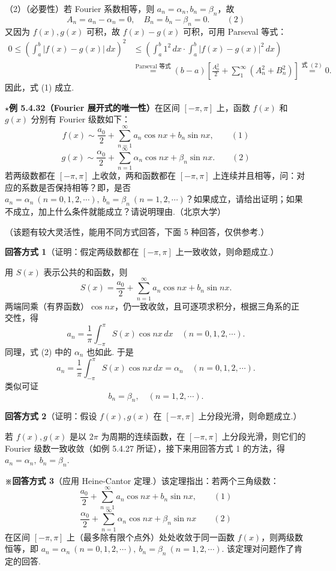 \documentclass[UTF8, 12pt, fontset=fandol, oneside]{ctexart}
\providecommand{\xlongequal}[1]{\stackrel{#1}{=}}
\begin{document}
（2）（必要性）若 Fourier 系数相等，则 $a_n=\alpha_n,b_n=\beta_n$，故
\[
  A_n=a_n-\alpha_n=0,\quad B_n=b_n-\beta_n=0. \qquad(2)
\]
又因为 $f(x),g(x)$ 可积，故 $f(x)-g(x)$ 可积，可用 Parseval 等式：
\[
\begin{aligned}
0\le\left(\int_a^b|f(x)-g(x)|\,dx\right)^2
&\le\left(\int_a^b1^2\,dx\cdot\int_a^b|f(x)-g(x)|^2\,dx\right)\\
&\xlongequal{\text{Parseval 等式}}
(b-a)\left[\frac{A_0^2}{2}+\sum_1^{\infty}(A_n^2+B_n^2)\right]
\xlongequal{\text{式 }(2)}0.
\end{aligned}
\]
因此，式 (1) 成立.

\noindent\(\star\)\textbf{例 5.4.32（Fourier 展开式的唯一性）}\quad 在区间 $[-\pi,\pi]$ 上，函数 $f(x)$ 和
$g(x)$ 分别有 Fourier 级数如下：
\[
  f(x)\sim\frac{a_0}{2}+\sum_{n=1}^{\infty}a_n\cos nx+b_n\sin nx, \qquad(1)
\]
\[
  g(x)\sim\frac{\alpha_0}{2}+\sum_{n=1}^{\infty}\alpha_n\cos nx+\beta_n\sin nx. \qquad(2)
\]
若两级数都在 $[-\pi,\pi]$ 上收敛，两和函数都在 $[-\pi,\pi]$ 上连续并且相等，问：对应的系数是否保持相等？即，是否
$a_n=\alpha_n\ (n=0,1,2,\cdots),\ b_n=\beta_n\ (n=1,2,\cdots)$？如果成立，请给出证明；如果不成立，加上什么条件就能成立？请说明理由.（北京大学）

（该题有较大灵活性，能用不同方式回答，下面 5 种回答，仅供参考.）

\noindent\textbf{回答方式 1}\quad （证明：假定两级数都在 $[-\pi,\pi]$ 上一致收敛，则命题成立.）

用 $S(x)$ 表示公共的和函数，则
\[
  S(x)=\frac{a_0}{2}+\sum_{n=1}^{\infty}a_n\cos nx+b_n\sin nx.
\]
两端同乘（有界函数）$\cos nx$，仍一致收敛，且可逐项求积分，根据三角系的正交性，得
\[
  a_n=\frac1\pi\int_{-\pi}^{\pi}S(x)\cos nx\,dx\quad(n=0,1,2,\cdots).
\]
同理，式 (2) 中的 $\alpha_n$ 也如此. 于是
\[
  a_n=\frac1\pi\int_{-\pi}^{\pi}S(x)\cos nx\,dx=\alpha_n\quad(n=0,1,2,\cdots).
\]
类似可证
\[
  b_n=\beta_n,\quad(n=1,2,\cdots).
\]

\noindent\textbf{回答方式 2}\quad （证明：假设 $f(x),g(x)$ 在 $[-\pi,\pi]$ 上分段光滑，则命题成立.）

若 $f(x),g(x)$ 是以 $2\pi$ 为周期的连续函数，在 $[-\pi,\pi]$ 上分段光滑，则它们的 Fourier 级数一致收敛（如例 5.4.27 所证），接下来用回答方式 1 的方法，得
$a_n=\alpha_n,\ b_n=\beta_n$.

\noindent\textbf{※回答方式 3}\quad （应用 Heine-Cantor 定理.）该定理指出：若两个三角级数：
\[
  \frac{a_0}{2}+\sum_{n=1}^{\infty}a_n\cos nx+b_n\sin nx, \qquad(1)
\]
\[
  \frac{\alpha_0}{2}+\sum_{n=1}^{\infty}\alpha_n\cos nx+\beta_n\sin nx \qquad(2)
\]
在区间 $[-\pi,\pi]$ 上（最多除有限个点外）处处收敛于同一函数 $f(x)$，则两级数恒等，即
$a_n=\alpha_n\ (n=0,1,2,\cdots),\ b_n=\beta_n\ (n=1,2,\cdots)$. 该定理对问题作了肯定的回答.
\end{document}
